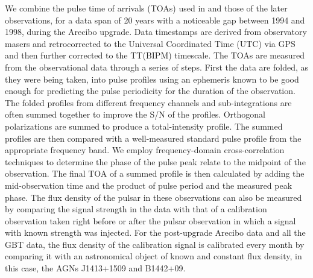 We combine the pulse time of arrivals (TOAs) used in \citealt{sns+05} and those
of the later observations, for a data span of 20 years with a
noticeable gap between 1994 and 1998, during the Arecibo upgrade.
Data timestamps are derived from observatory masers and retrocorrected
to the Universal Coordinated Time (UTC) via GPS and then further
corrected to the TT(BIPM) timescale.
The TOAs are measured from the observational data through a series of
steps. First the data are folded, as they were being taken, into pulse
profiles using an ephemeris known to be good enough for predicting the
pulse periodicity for the duration of the observation. The folded
profiles from different frequency channels and sub-integrations are
often summed together to improve the S/N of the profiles.  Orthogonal
polarizations are summed to produce a total-intensity profile.
The summed profiles are then compared with a well-measured standard
pulse profile from the appropriate frequency band. We employ
frequency-domain cross-correlation techniques \citep{tay92} to determine the phase of the pulse peak relate to the midpoint of the observation. The final TOA of a summed profile is then calculated by adding the mid-observation time and the product of pulse period and the measured peak phase.
The flux density of the pulsar in these observations can also be
measured by comparing the signal strength in the data with that of a
calibration observation taken right before or after the pulsar
observation in which a signal with known strength was injected. For
the post-upgrade Arecibo data and all the GBT data, the
flux density of the calibration signal is calibrated every month by
comparing it with an astronomical object of known and constant flux
density, in this case, the AGNs J1413+1509 and B1442+09.





